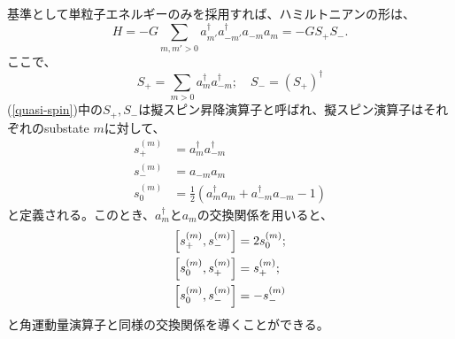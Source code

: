 \documentclass[a4paper]{jsreport}
\begin{document}
  基準として単粒子エネルギーのみを採用すれば、ハミルトニアンの形は、
  \begin{equation}
    H=-G\sum_{m,m'>0}a^{\dagger}_{m'}a^{\dagger}_{-m'}a_{-m}a_{m}=-GS_{+}S_{-}.
  \end{equation}
  ここで、
  \begin{equation}
    S_{+}=\sum_{m>0}a^{\dagger}_{m}a^{\dagger}_{-m};\quad S_{-}=(S_{+})^{\dagger}\label{quasi-spin}
  \end{equation}
  (\ref{quasi-spin})中の\(S_{+},S_{-}\)は擬スピン昇降演算子と呼ばれ、擬スピン演算子はそれぞれのsubstate \(m\)に対して、
  \begin{align}
    s^{(m)}_+ &= a^{\dagger}_{m}a^{\dagger}_{-m}\\
    s^{(m)}_- &= a_{-m}a_{m}\\
    s^{(m)}_0 &= \frac{1}{2}\left(a^{\dagger}_{m}a_{m}+a^{\dagger}_{-m}a_{-m}-1\right)
  \end{align}
  と定義される。このとき、\(a^{\dagger}_{m}\)と\(a_{m}\)の交換関係を用いると、
  \begin{align}
    \comm{s^{(m)}_+}{s^{(m)}_-} &= 2s^{(m)}_0;\\
    \comm{s^{(m)}_0}{s^{(m)}_+} &= s^{(m)}_+;\\
    \comm{s^{(m)}_0}{s^{(m)}_-} &= -s^{(m)}_-
  \end{align}
  と角運動量演算子と同様の交換関係を導くことができる。
\end{document}
